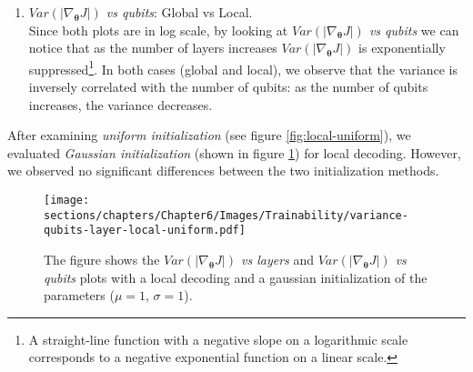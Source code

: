 \begin{enumerate}
    \item \textit{$Var(|\nabla_{\bm{\theta}}J|)$ vs qubits}: Global vs Local.\\
    Since both plots are in log scale, by looking at 
    \textit{$Var(|\nabla_{\bm{\theta}}J|)$ vs qubits} we can notice that as the number of layers increases 
    $Var(|\nabla_{\bm{\theta}}J|)$ is exponentially suppressed\footnote[1]{A straight-line function 
    with a negative slope on a logarithmic scale corresponds to a negative exponential function 
    on a linear scale.}. 
    In both cases (global and local), we observe that the variance 
    is inversely correlated with the number of qubits: as the number of qubits increases, 
    the variance decreases.
\end{enumerate}


After examining \textit{uniform initialization} (see figure \ref{fig:local-uniform}), we evaluated 
\textit{Gaussian initialization} (shown in figure \ref{fig:local-gauss}) for local decoding. However, 
we observed no significant differences between the two initialization methods.


\begin{figure}[h]
    \centering
    \texttt{[image: sections/chapters/Chapter6/Images/Trainability/variance-qubits-layer-local-uniform.pdf]}
    \caption{The figure shows the \textit{$Var(|\nabla_{\bm{\theta}}J|)$ vs layers} and
    \textit{$Var(|\nabla_{\bm{\theta}}J|)$ vs qubits} plots with a local decoding
    and a gaussian initialization of the parameters ($\mu = 1$, $\sigma = 1$).}
    \label{fig:local-gauss}
\end{figure}